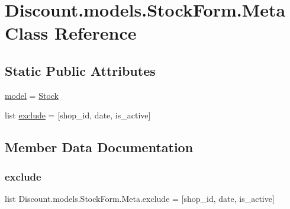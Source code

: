 \hypertarget{class_discount_1_1models_1_1_stock_form_1_1_meta}{}\section{Discount.\+models.\+Stock\+Form.\+Meta Class Reference}
\label{class_discount_1_1models_1_1_stock_form_1_1_meta}
\subsection*{Static Public Attributes}
\begin{DoxyCompactItemize}
\item 
\hyperlink{class_discount_1_1models_1_1_stock_form_1_1_meta_aba792927254bef9690ff7ce05fb20eb1}{model} = \hyperlink{class_discount_1_1models_1_1_stock}{Stock}
\item 
list \hyperlink{class_discount_1_1models_1_1_stock_form_1_1_meta_acc71a823a7a1abbc0422c0ecfdfbb341}{exclude} = \mbox{[}\textquotesingle{}shop\+\_\+id\textquotesingle{}, \textquotesingle{}date\textquotesingle{}, \textquotesingle{}is\+\_\+active\textquotesingle{}\mbox{]}
\end{DoxyCompactItemize}


\subsection{Member Data Documentation}
\mbox{\label{class_discount_1_1models_1_1_stock_form_1_1_meta_acc71a823a7a1abbc0422c0ecfdfbb341}} 
\subsubsection{\texorpdfstring{exclude}{exclude}}
{\footnotesize\ttfamily list Discount.\+models.\+Stock\+Form.\+Meta.\+exclude = \mbox{[}\textquotesingle{}shop\+\_\+id\textquotesingle{}, \textquotesingle{}date\textquotesingle{}, \textquotesingle{}is\+\_\+active\textquotesingle{}\mbox{]}\hspace{0.3cm}{\ttfamily [static]}}

\mbox{\label{class_discount_1_1models_1_1_stock_form_1_1_meta_aba792927254bef9690ff7ce05fb20eb1}} 
